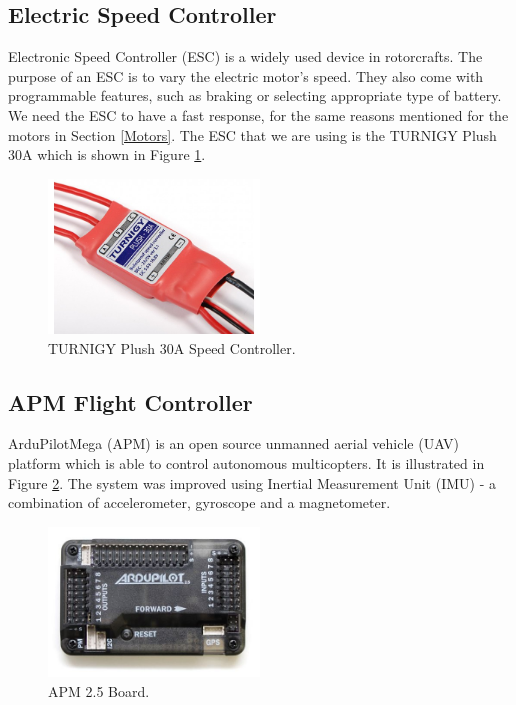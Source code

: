 \subsection{Electric Speed Controller}
Electronic Speed Controller (ESC) is a widely used device in rotorcrafts. The purpose of an ESC is to vary the electric motor's speed. They also come with programmable features, such as braking or selecting appropriate type of battery. We need the ESC to have a fast response, for the same reasons mentioned for the motors in Section \ref{Motors}. The ESC that we are using is the TURNIGY Plush 30A which is shown in Figure \ref{esc}.
 
\begin{figure}[H]
  \centering
    \includegraphics[width=0.5\textwidth]{images/esc.jpg}
	\caption{TURNIGY Plush 30A Speed Controller.\cite{ESCFig}}
	\label{esc}
\end{figure}

\subsection{APM Flight Controller}
ArduPilotMega (APM) is an open source unmanned aerial vehicle (UAV) platform which is able to control autonomous multicopters. It is illustrated in Figure \ref{ardupilot}. The system was improved using Inertial Measurement Unit (IMU) - a combination of accelerometer, gyroscope and a magnetometer.

\begin{figure}[H]
  \centering
    \includegraphics[width=0.5\textwidth]{images/ardupilot.jpg}
	\caption{APM 2.5 Board.\cite{APMFig}}
	\label{ardupilot}
\end{figure}

